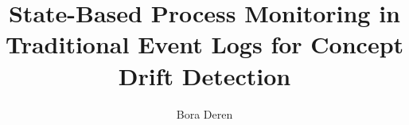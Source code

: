 \documentclass[bachelor]{padsthesis}
\begin{document}
\author{Bora Deren}
\title{State-Based Process Monitoring in Traditional Event Logs for Concept Drift Detection}

\maketitle

\frontmatter





\tableofcontents
\listoffigures
\listoftables

\mainmatter



















\backmatter
\printbibliography
\end{document}
